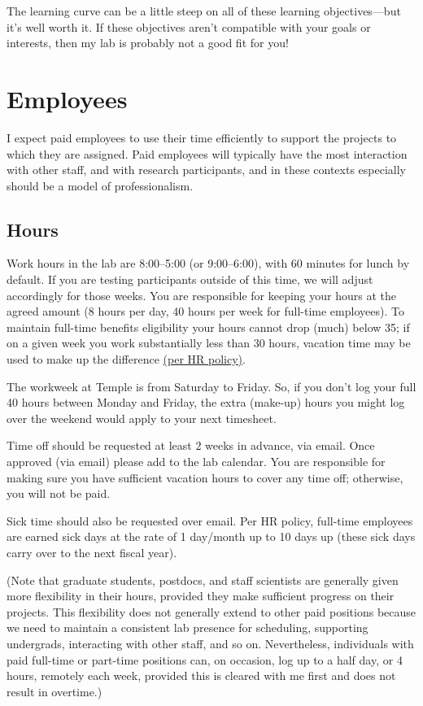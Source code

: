 \documentclass[letterpaper,12pt,oneside]{memoir}
\begin{document}
The learning curve can be a little steep on all of these learning objectives---but it's well worth it. If these objectives aren't compatible with your goals or interests, then my lab is probably not a good fit for you!



\section{Employees}

I expect paid employees to use their time efficiently to support the projects to which they are assigned. Paid employees will typically have the most interaction with other staff, and with research participants, and in these contexts especially should be a model of professionalism.

\subsection{Hours}
Work hours in the lab are 8:00--5:00 (or 9:00--6:00), with 60 minutes for lunch by default. If you are testing participants outside of this time, we will adjust accordingly for those weeks. You are responsible for keeping your hours at the agreed amount (8 hours per day, 40 hours per week for full-time employees). To maintain full-time benefits eligibility your hours cannot drop (much) below 35; if on a given week you work substantially less than 30 hours, vacation time may be used to make up the difference \href{http://www.temple.edu/hr/departments/employeerelations/documents/Employee_Manual_Feb_2016.pdf}{(per HR policy)}.

The workweek at Temple is from Saturday to Friday. So, if you don't log your full 40 hours between Monday and Friday, the extra (make-up) hours you might log over the weekend would apply to your next timesheet. 

Time off should be requested at least 2 weeks in advance, via email. Once approved (via email) please add to the lab calendar. You are responsible for making sure you have sufficient vacation hours to cover any time off; otherwise, you will not be paid.

Sick time should also be requested over email. Per HR policy, full-time employees are earned sick days at the rate of 1 day/month up to 10 days up (these sick days carry over to the next fiscal year).

(Note that graduate students, postdocs, and staff scientists are generally given more flexibility in their hours, provided they make sufficient progress on their projects. This flexibility does not generally extend to other paid positions because we need to maintain a consistent lab presence for scheduling, supporting undergrads, interacting with other staff, and so on. Nevertheless, individuals with paid full-time or part-time positions can, on occasion, log up to a half day, or 4 hours, remotely each week, provided this is cleared with me first and does not result in overtime.)
\end{document}
